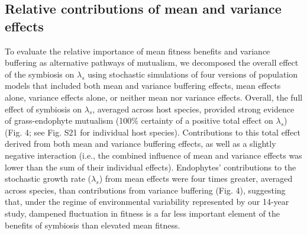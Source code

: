 \documentclass[9pt,twocolumn,twoside]{pnas-new}
\begin{document}
\subsection*{Relative contributions of mean and variance effects}
To evaluate the relative importance of mean fitness benefits and variance buffering as alternative pathways of mutualism, we decomposed  the overall effect of the symbiosis on $\lambda_s$ using stochastic simulations of four versions of population models that included both mean and variance buffering effects, mean effects alone, variance effects alone, or neither mean nor variance effects. 
Overall, the full effect of symbiosis on $\lambda_s$, averaged across host species, provided strong evidence of grass-endophyte mutualism (100\% certainty of a positive total effect on $\lambda_s$) (Fig. 4; see Fig. S21 for individual host species).
Contributions to this total effect derived from both mean and variance buffering effects, as well as a slightly negative interaction (i.e., the combined influence of mean and variance effects was lower than the sum of their individual effects). 
Endophytes' contributions to the stochastic growth rate ($\lambda_s$) from mean effects were four times greater, averaged across species, than contributions from variance buffering (Fig. 4), suggesting that, under the regime of environmental variability represented by our 14-year study, dampened fluctuation in fitness is a far less important element of the benefits of symbiosis than elevated mean fitness. 
\end{document}
